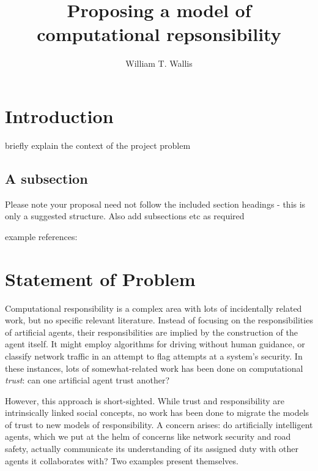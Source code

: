 \documentclass{mprop}
\begin{document}
\title{Proposing a model of computational repsonsibility}
\author{William T. Wallis}
\date{}
\maketitle

\tableofcontents
\newpage

\section{Introduction}\label{intro}

briefly explain the context of the project problem

\subsection{A subsection}
Please note your proposal need not follow the included section headings - this is only a suggested structure. Also add subsections etc as required

example references: \cite{BK08}

\section{Statement of Problem}

Computational responsibility is a complex area with lots of incidentally related work, but no specific relevant literature. Instead of focusing on the responsibilities of artificial agents, their responsibilities are implied by the construction of the agent itself. It might employ algorithms for driving without human guidance, or classify network traffic in an attempt to flag attempts at a system's security. In these instances, lots of somewhat-related work has been done on computational \emph{trust}: can one artificial agent trust another?\par

However, this approach is short-sighted. While trust and responsibility are intrinsically linked social concepts, no work has been done to migrate the models of trust to new models of responsibility. A concern arises: do artificially intelligent agents, which we put at the helm of concerns like network security and road safety, actually communicate its understanding of its assigned duty with other agents it collaborates with? Two examples present themselves.\par
\end{document}
